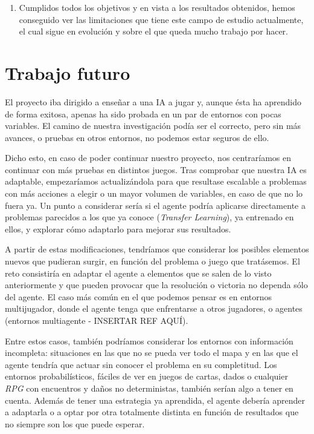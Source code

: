 \begin{enumerate}
        \item Cumplidos todos los objetivos y en vista a los resultados obtenidos, hemos conseguido ver las limitaciones que tiene este campo de estudio actualmente, el cual sigue en evolución y sobre el que queda mucho trabajo por hacer.
\end{enumerate}

\section{Trabajo futuro}

El proyecto iba dirigido a enseñar a una IA a jugar y, aunque ésta ha aprendido de forma exitosa, apenas ha sido probada en un par de entornos con pocas variables. El camino de nuestra investigación podía ser el correcto, pero sin más avances, o pruebas en otros entornos, no podemos estar seguros de ello. 

Dicho esto, en caso de poder continuar nuestro proyecto, nos centraríamos en continuar con más pruebas en distintos juegos. Tras comprobar que nuestra IA es adaptable, empezaríamos actualizándola para que resultase escalable a problemas con más acciones a elegir o un mayor volumen de variables, en caso de que no lo fuera ya. Un punto a considerar sería si el agente podría aplicarse directamente a problemas parecidos a los que ya conoce (\textit{Transfer Learning}), ya entrenado en ellos, y explorar cómo adaptarlo para mejorar sus resultados.

A partir de estas modificaciones, tendríamos que considerar los posibles elementos nuevos que pudieran surgir, en función del problema o juego que tratásemos. El reto consistiría en adaptar el agente a elementos que se salen de lo visto anteriormente y que pueden provocar que la resolución o victoria no dependa sólo del agente. El caso más común en el que podemos pensar es en entornos multijugador, donde el agente tenga que enfrentarse a otros jugadores, o agentes (entornos multiagente - INSERTAR REF AQUÍ). 

Entre estos casos, también podríamos considerar los entornos con información incompleta: situaciones en las que no se pueda ver todo el mapa y en las que el agente tendría que actuar sin conocer el problema en su completitud. Los entornos probabilísticos, fáciles de ver en juegos de cartas, dados o cualquier \textit{RPG} con encuentros y daños no deterministas, también serían algo a tener en cuenta. Además de tener una estrategia ya aprendida, el agente debería aprender a adaptarla o a optar por otra totalmente distinta en función de resultados que no siempre son los que puede esperar. 

